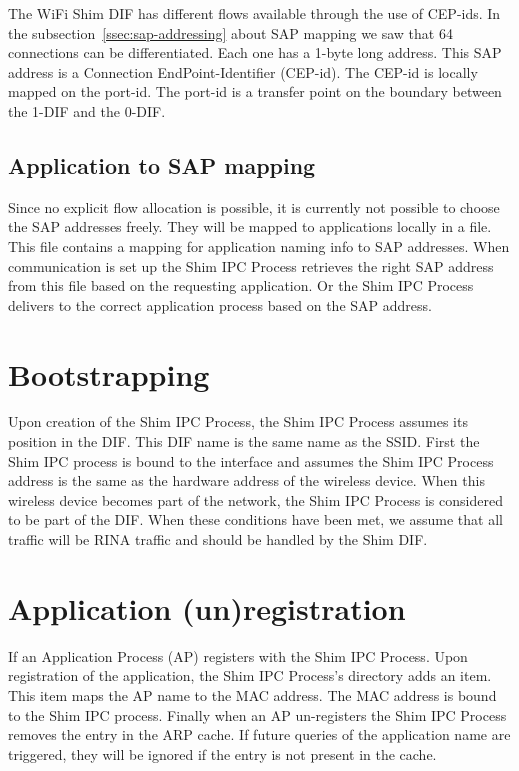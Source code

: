 The WiFi Shim DIF has different flows available through the use of CEP-ids. In the subsection~\ref{ssec:sap-addressing} about SAP mapping we saw that 64 connections can be differentiated. Each one has a 1-byte long address. This SAP address is a Connection EndPoint-Identifier (CEP-id). The CEP-id is locally mapped on the port-id. The port-id is a transfer point on the boundary between the 1-DIF and the 0-DIF. 

\subsection{Application to SAP mapping}

Since no explicit flow allocation is possible, it is currently not possible to choose the SAP addresses freely. They will be mapped to applications locally in a file. This file contains a mapping for application naming info to SAP addresses. When communication is set up the Shim IPC Process retrieves the right SAP address from this file based on the requesting application. Or the Shim IPC Process delivers to the correct application process based on the SAP address. 

\section{Bootstrapping}

Upon creation of the Shim IPC Process, the Shim IPC Process assumes its position in the DIF. This DIF name is the same name as the SSID. First the Shim IPC process is bound to the interface and assumes the Shim IPC Process address is the same as the hardware address of the wireless device. When this wireless device becomes part of the network, the Shim IPC Process is considered to be part of the DIF. When these conditions have been met, we assume that all traffic will be RINA traffic and should be handled by the Shim DIF.

\section{Application (un)registration}

If an Application Process (AP) registers with the Shim IPC Process. Upon registration of the application, the Shim IPC Process's directory adds an item. This item maps the AP name to the MAC address. The MAC address is bound to the Shim IPC process. Finally when an AP un-registers the Shim IPC Process removes the entry in the ARP cache. If future queries of the application name are triggered, they will be ignored if the entry is not present in the cache.

